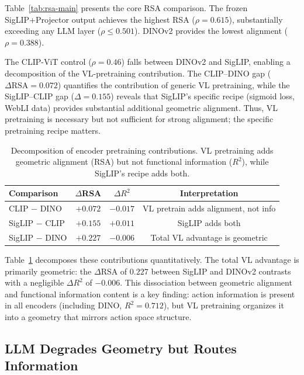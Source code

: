 \documentclass[letterpaper]{article}
\begin{document}
Table~\ref{tab:rsa-main} presents the core RSA comparison.
The frozen SigLIP+Projector output achieves the highest RSA ($\rho{=}0.615$), substantially exceeding any LLM layer ($\rho \leq 0.501$).
DINOv2 provides the lowest alignment ($\rho{=}0.388$).

The CLIP-ViT control ($\rho{=}0.46$) falls between DINOv2 and SigLIP, enabling a decomposition of the VL-pretraining contribution.
The CLIP--DINO gap ($\Delta\text{RSA}{=}0.072$) quantifies the contribution of generic VL pretraining, while the SigLIP--CLIP gap ($\Delta{=}0.155$) reveals that SigLIP's specific recipe (sigmoid loss, WebLI data) provides substantial additional geometric alignment.
Thus, VL pretraining is necessary but not sufficient for strong alignment; the specific pretraining recipe matters.

\begin{table}[t]
\centering
\caption{Decomposition of encoder pretraining contributions. VL pretraining adds geometric alignment (RSA) but not functional information ($R^2$), while SigLIP's recipe adds both.}
\label{tab:encoder-decomposition}
\begin{tabular}{lccc}
\toprule
\textbf{Comparison} & \textbf{$\Delta$RSA} & \textbf{$\Delta R^2$} & \textbf{Interpretation} \\
\midrule
CLIP $-$ DINO   & $+0.072$ & $-0.017$ & VL pretrain adds alignment, not info \\
SigLIP $-$ CLIP & $+0.155$ & $+0.011$ & SigLIP adds both \\
SigLIP $-$ DINO & $+0.227$ & $-0.006$ & Total VL advantage is geometric \\
\bottomrule
\end{tabular}
\end{table}

Table~\ref{tab:encoder-decomposition} decomposes these contributions quantitatively.
The total VL advantage is primarily geometric: the $\Delta$RSA of $0.227$ between SigLIP and DINOv2 contrasts with a negligible $\Delta R^2$ of $-0.006$.
This dissociation between geometric alignment and functional information content is a key finding: action information is present in all encoders (including DINO, $R^2{=}0.712$), but VL pretraining organizes it into a geometry that mirrors action space structure.

\subsection{LLM Degrades Geometry but Routes Information}
\label{sec:exp-degradation}
\end{document}
